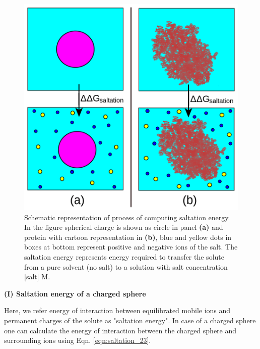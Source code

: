 \documentclass[9pt,tutorial]{livecoms}
\begin{document}
\begin{figure}[hbt!]
\includegraphics[width=\linewidth]{Figure_6.png}
\caption{Schematic representation of process of computing saltation energy. In the figure spherical charge is shown as circle in panel \textbf{(a)} and protein with cartoon representation in \textbf{(b)}, blue and yellow dots in boxes at bottom represent positive and negative ions of the salt. The saltation energy represents energy required to transfer the solute from a pure solvent (no salt) to a solution with salt concentration [salt] M.}
\label{fig:scheme_saltation}
\end{figure}


\textbf{(I) Saltation energy of a charged sphere}

Here, we refer energy of interaction between equilibrated mobile ions and permanent charges of the solute as "saltation energy". In case of a charged sphere one can calculate the energy of interaction between the charged sphere and surrounding ions using Eqn. \ref{eqn:saltation_23}.
\end{document}
